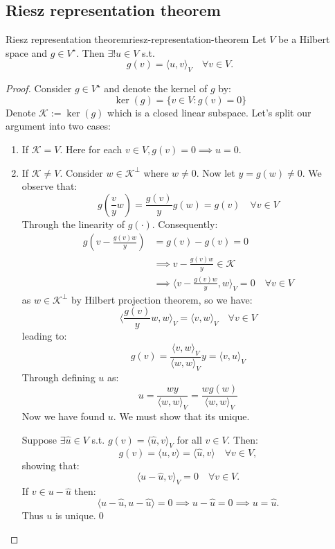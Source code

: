 \subsection{Riesz representation theorem}
\begin{theorem}{Riesz representation theorem}{riesz-representation-theorem}
    Let $V$ be a Hilbert space and $g \in V^\star$. Then $\exists! u \in V$ s.t.
    \[
        g(v) = \langle u, v \rangle_V \quad \forall v \in V.
    \]
\end{theorem}
\begin{proof}
    Consider $g \in V^\star$ and denote the kernel of $g$ by:
    \[
        \ker(g) = \{v \in V : g(v) = 0\}
    \]
    Denote $\mathcal{K} := \ker(g)$ which is a closed linear subspace. Let's split our argument into two cases:
    \begin{enumerate}
        \item If $\mathcal{K} = V$. Here for each $v \in V, g(v) = 0 \implies u = 0$.
        \item If $\mathcal{K} \neq V$. Consider $w \in \mathcal{K}^\perp$ where $w \neq 0$. Now let $y = g(w) \neq 0$. We observe that:
              \[
                  g(\frac{v}{y} w)  = \frac{g(v)}{y} g(w) = g(v) \quad \forall v \in V
              \]
              Through the linearity of $g(\cdot)$. Consequently:
              \begin{align*}
                  g(v - \frac{g(v)w}{y}) & = g(v) - g(v) = 0                                                           \\
                                         & \implies v - \frac{g(v)w}{y} \in \mathcal{K}                                \\
                                         & \implies \langle v - \frac{g(v)w}{y}, w \rangle_V = 0 \quad \forall v \in V
              \end{align*}
              as $w \in \mathcal{K}^\perp$ by Hilbert projection theorem, so we have:
              \[\langle \frac{g(v)}{y} w, w \rangle_V = \langle v, w \rangle_V \quad \forall v \in V\]
              leading to:
              \[
                  g(v) = \frac{\langle v, w \rangle_V}{\langle w, w \rangle_V} y = \langle v, u \rangle_V
              \]
              Through defining $u$ as:
              \[
                  u = \frac{w y}{\langle w, w \rangle_V}= \frac{w g(w)}{\langle w, w \rangle_V}
              \]
              Now we have found $u$. We must show that its unique.

              Suppose $\exists \hat{u} \in V$ s.t. $g(v) = \langle \hat{u}, v \rangle_V$ for all $v \in V$. Then:
              \[
                  g(v) = \langle u, v \rangle = \langle \hat{u}, v \rangle \quad \forall v \in V,
              \]
              showing that:
              \[
                  \langle u - \hat{u}, v \rangle_V = 0 \quad \forall v \in V.
              \]
              If $v \in u - \hat{u}$ then:
              \[
                  \langle u - \hat{u}, u - \hat{u} \rangle = 0 \implies u - \hat{u} = 0 \implies u = \hat{u}.
              \]
              Thus $u$ is unique.\qed
    \end{enumerate}
\end{proof}

